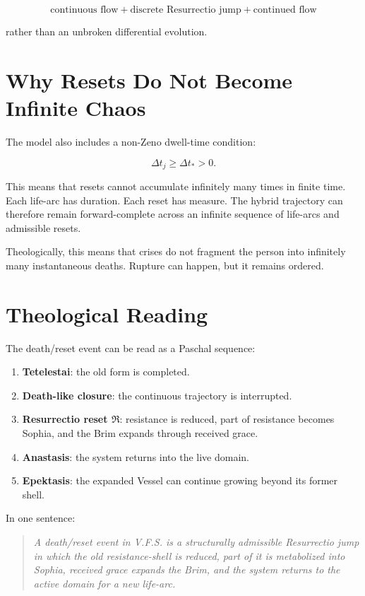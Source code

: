 \documentclass[11pt]{article}
\begin{document}
\[
\boxed{
\text{continuous flow}
+
\text{discrete Resurrectio jump}
+
\text{continued flow}
}
\]

rather than an unbroken differential evolution.

\section{Why Resets Do Not Become Infinite Chaos}

The model also includes a non-Zeno dwell-time condition:

\[
\Delta t_j\ge \Delta t_*>0.
\]

This means that resets cannot accumulate infinitely many times in finite time. Each life-arc has duration. Each reset has measure. The hybrid trajectory can therefore remain forward-complete across an infinite sequence of life-arcs and admissible resets.

Theologically, this means that crises do not fragment the person into infinitely many instantaneous deaths. Rupture can happen, but it remains ordered.

\section{Theological Reading}

The death/reset event can be read as a Paschal sequence:

\begin{enumerate}[label=\arabic*.]
  \item \textbf{Tetelestai}: the old form is completed.
  \item \textbf{Death-like closure}: the continuous trajectory is interrupted.
  \item \textbf{Resurrectio reset \(\mathfrak R\)}: resistance is reduced, part of resistance becomes Sophia, and the Brim expands through received grace.
  \item \textbf{Anastasis}: the system returns into the live domain.
  \item \textbf{Epektasis}: the expanded Vessel can continue growing beyond its former shell.
\end{enumerate}

In one sentence:

\begin{quote}
\emph{A death/reset event in V.F.S. is a structurally admissible Resurrectio jump in which the old resistance-shell is reduced, part of it is metabolized into Sophia, received grace expands the Brim, and the system returns to the active domain for a new life-arc.}
\end{quote}
\end{document}
